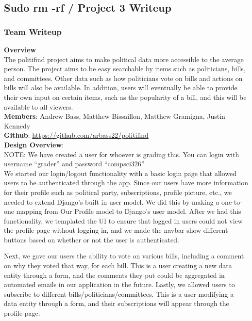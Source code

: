 \documentclass{article}
\newcommand{\n}{\noindent}
\begin{document}
\begin{center}
\subsection*{Sudo rm -rf / Project 3 Writeup}
\end{center}

\subsubsection*{Team Writeup}

\textbf{Overview} \\

The politifind project aims to make political data more accessible to the average person. The project aims to be easy searchable by items such as politicians, bills, and committees. Other data such as how politicians vote on bills and actions on bills will also be available. In addition, users will eventually be able to provide their own input on certain items, such as the popularity of a bill, and this will be available to all viewers. \\

\n\textbf{Members}: Andrew Bass, Matthew Bissaillon, Matthew Gramigna, Justin Kennedy \\

\n\textbf{Github}: \url{https://github.com/arbass22/politifind} \\

\n\textbf{Design Overview}: \\

\n NOTE: We have created a user for whoever is grading this. You can login with username ``grader'' and password ``compsci326'' \\

We started our login/logout functionality with a basic login page that allowed users to be authenticated through the app. Since our users have more information for their profile such as political party, subscriptions, profile picture, etc., we needed to extend Django's built in user model. We did this by making a one-to-one mapping from Our Profile model to Django's user model. After we had this functionality, we templated the UI to ensure that logged in users could not view the profile page without logging in, and we made the navbar show different buttons based on whether or not the user is authenticated.

Next, we gave our users the ability to vote on various bills, including a comment on why they voted that way, for each bill. This is a user creating a new data entity through a form, and the comments they put could be aggregated in automated emails in our application in the future.  Lastly, we allowed users to subscribe to different bills/politicians/committees. This is a user modifying a data entity through a form, and their subscriptions will appear through the profile page.\\
\end{document}
